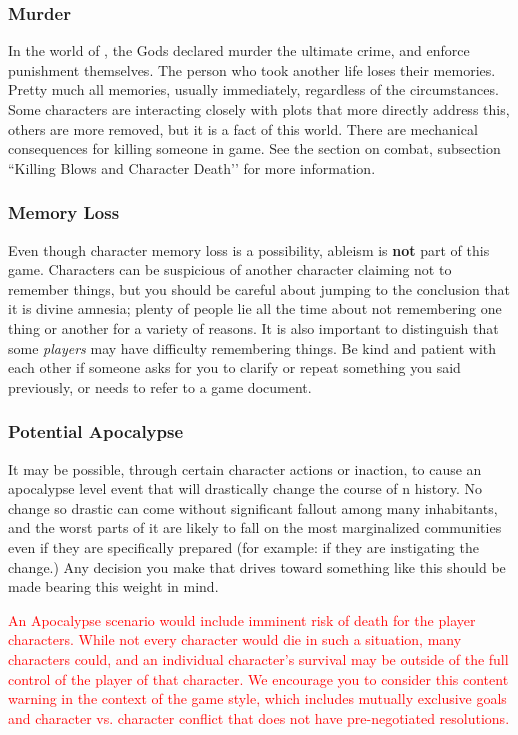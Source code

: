 \documentclass[sheet]{GL2020}
\begin{document}
\subsubsection{Murder}
In the world of \pEarth{}, the Gods declared murder the ultimate crime, and enforce punishment themselves. The person who took another life loses their memories. Pretty much all memories, usually immediately, regardless of the circumstances. Some characters are interacting closely with plots that more directly address this, others are more removed, but it is a fact of this world. There are mechanical consequences for killing someone in game. See the section on combat, subsection ``Killing Blows and Character Death'’ for more information.

\subsubsection{Memory Loss}
Even though character memory loss is a possibility, ableism is \textbf{not} part of this game. Characters can be suspicious of another character claiming not to remember things, but you should be careful about jumping to the conclusion that it is divine amnesia; plenty of people lie all the time about not remembering one thing or another for a variety of reasons. It is also important to distinguish that some \emph{players} may have difficulty remembering things. Be kind and patient with each other if someone asks for you to clarify or repeat something you said previously, or needs to refer to a game document.

\subsubsection{Potential Apocalypse}
It may be possible, through certain character actions or inaction, to cause an apocalypse level event that will drastically change the course of \pEarth{}n history. No change so drastic can come without significant fallout among many inhabitants, and the worst parts of it are likely to fall on the most marginalized communities even if they are specifically prepared (for example: if they are instigating the change.) Any decision you make that drives toward something like this should be made bearing this weight in mind.

\textcolor{red}{An Apocalypse scenario would include imminent risk of death for the player characters. While not every character would die in such a situation, many characters could, and an individual character's survival may be outside of the full control of the player of that character. We encourage you to consider this content warning in the context of the game style, which includes mutually exclusive goals and character vs. character conflict that does not have pre-negotiated resolutions.}
\end{document}
